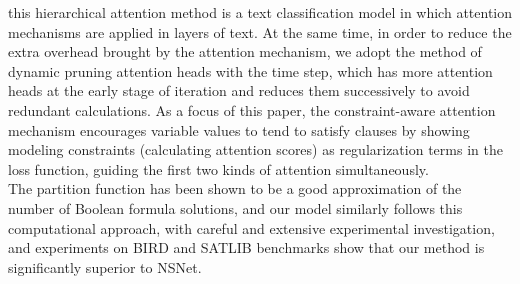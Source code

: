 this hierarchical attention method is a text classification model in which attention mechanisms are applied in layers of text. At the same time, 
in order to reduce the extra overhead brought by the attention mechanism, we adopt the method of dynamic pruning attention heads with the time step\cite{B6}\cite{A16}, which has more attention heads at the early stage of iteration and reduces them successively to avoid redundant calculations.
As a focus of this paper, the constraint-aware attention mechanism encourages variable values to tend to satisfy clauses by showing modeling constraints (calculating attention scores) as regularization terms in the loss function, guiding the first two kinds of attention simultaneously. \\
The partition function has been shown to be a good approximation of the number of Boolean formula solutions\cite{A17}\cite{A18}, and our model 
similarly follows this computational approach, with careful and extensive experimental investigation, and experiments on BIRD and SATLIB benchmarks 
show that our method is significantly superior to NSNet. 
